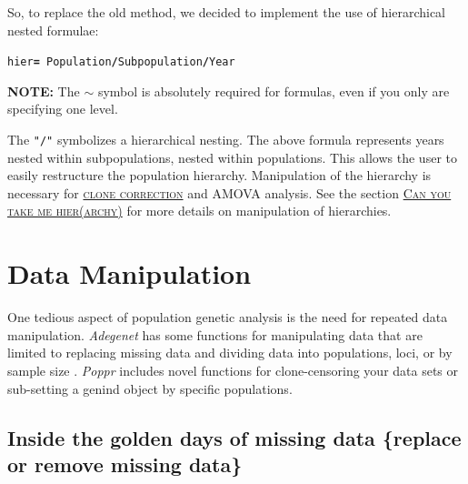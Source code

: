 \documentclass[letterpaper]{article}\usepackage[]{graphicx}\usepackage[]{color}
\makeatletter
\newcommand{\hlopt}[1]{\textcolor[rgb]{1,0,0.502}{\textbf{#1}}}%
\newcommand{\hlstd}[1]{\textcolor[rgb]{0,0,0}{#1}}%
\newcommand{\hlkwb}[1]{\textcolor[rgb]{0.502,0.502,0.753}{\textbf{#1}}}%
\newenvironment{kframe}{%
 \def\at@end@of@kframe{}%
 \ifinner\ifhmode%
  \def\at@end@of@kframe{\end{minipage}}%
  \begin{minipage}{\columnwidth}%
 \fi\fi%
 \def\FrameCommand##1{\hskip\@totalleftmargin \hskip-\fboxsep
 \colorbox{shadecolor}{##1}\hskip-\fboxsep
     \hskip-\linewidth \hskip-\@totalleftmargin \hskip\columnwidth}%
 \MakeFramed {\advance\hsize-\width
   \@totalleftmargin\z@ \linewidth\hsize
   \@setminipage}}%
 {\par\unskip\endMakeFramed%
 \at@end@of@kframe}
\newenvironment{knitrout}{}{} %
\newcommand{\tab}{\hspace*{1em}}
\newcommand{\seclink}[2]{
  \textsc{\hyperref[#1]{#2}}
}
\newcommand{\Poppr}{\textit{Poppr}}
\newcommand{\Adegenet}{\textit{Adegenet}}
\makeatother
\begin{document}
So, to replace the old method, we decided to implement the use of hierarchical
nested formulae:
\begin{knitrout}\footnotesize
{}\color{fgcolor}\begin{kframe}
\begin{alltt}
\hlstd{hier} \hlkwb{=} \hlopt{~}\hlstd{Population}\hlopt{/}\hlstd{Subpopulation}\hlopt{/}\hlstd{Year}
\end{alltt}
\end{kframe}
\end{knitrout}

\textbf{NOTE:} The $\sim$ symbol is absolutely required for formulas, even if you only 
are specifying one level.

The \texttt{"/"} symbolizes a hierarchical nesting. The above formula represents
years nested within subpopulations, nested within populations. This allows the
user to easily restructure the population hierarchy. Manipulation of the hierarchy
is necessary for\seclink{data.manip:cc}{clone correction}and AMOVA analysis. See the section\seclink{data.manip:hier}{Can you take me hier(archy)}for more details on manipulation of hierarchies. 

%
%
%
\section{Data Manipulation}
\label{data.manip}

\tab\tab One tedious aspect of population genetic analysis is the need for repeated data manipulation. \Adegenet{} has some functions for manipulating data that are limited to replacing missing data and dividing data into populations, loci, or by sample size \cite{Jombart:2008}. \Poppr{} includes novel functions for clone-censoring your data sets or sub-setting a genind object by specific populations.
%
\subsection{Inside the golden days of missing data \{replace or remove missing data\}}
\label{data.manip:missing}
\end{document}
